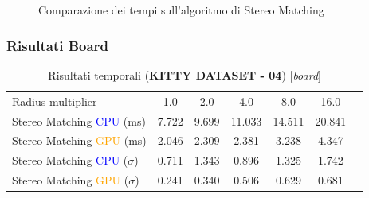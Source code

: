 \documentclass[12pt,a4paper]{report}
\begin{document}
\begin{figure}[H]
    \centering
    \caption{Comparazione dei tempi sull'algoritmo di Stereo Matching }
\end{figure}


\subsubsection{Risultati Board}


\vspace{1cm}
\begin{table}[H]
    \centering
    \caption{Risultati temporali (\textbf{KITTY DATASET - 04}) [\textit{board}] }
    \begin{tabular}{lcccccc}
        \toprule
        \rowcolor{gray!20}
        Radius multiplier & 1.0 & \cellcolor{orange!40}2.0 & 4.0 & 8.0 & 16.0 \\
        Stereo Matching \textcolor{blue}{CPU} (ms) & 7.722 & 9.699 & 11.033 & 14.511 & 20.841\\
        Stereo Matching \textcolor{orange}{GPU} (ms) & 2.046 & 2.309 & 2.381 & 3.238 & 4.347 \\
        Stereo Matching \textcolor{blue}{CPU} ($\sigma$) & 0.711 & 1.343 & 0.896 & 1.325 & 1.742\\
        Stereo Matching \textcolor{orange}{GPU} ($\sigma$) & 0.241 & 0.340 & 0.506 & 0.629 & 0.681 \\
        \bottomrule
    \end{tabular}
\end{table}
\end{document}
